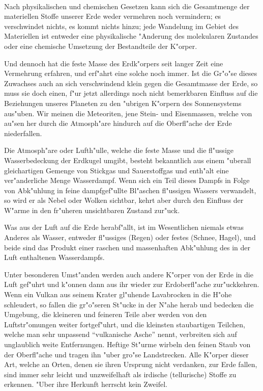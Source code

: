 \documentclass[a4paper, 11pt, oneside]{article}
\begin{document}
\paragraph{}
Nach physikalischen und chemischen Gesetzen kann sich die Gesamtmenge der materiellen Stoffe unserer Erde weder vermehren noch vermindern; es verschwindet nichts, es kommt nichts hinzu; jede Wandelung im Gebiet des Materiellen ist entweder eine physikalische "Anderung des molekularen Zustandes oder eine chemische Umsetzung der Bestandteile der K"orper.

Und dennoch hat die feste Masse des Erdk"orpers seit langer Zeit eine Vermehrung erfahren, und erf"ahrt eine solche noch immer. Ist die Gr"o"se dieses Zuwachses auch an sich verschwindend klein gegen die Gesamtmasse der Erde, so muss sie doch einen, f"ur jetzt allerdings noch nicht bemerkbaren Einfluss auf die Beziehungen unseres Planeten zu den "ubrigen K"orpern des Sonnensystems aus"uben. Wir meinen die Meteoriten, jene Stein- und Eisenmassen, welche von au"sen her durch die Atmosph"are hindurch auf die Oberfl"ache der Erde niederfallen.

Die Atmosph"are oder Lufth"ulle, welche die feste Masse und die fl"ussige Wasserbedeckung der Erdkugel umgibt, besteht bekanntlich aus einem "uberall gleichartigen Gemenge von Stickgas und Sauerstoffgas und enth"alt eine ver"anderliche Menge Wasserdampf. Wenn sich ein Teil dieses Dampfs in Folge von Abk"uhlung in feine dampfgef"ullte Bl"aschen fl"ussigen Wassers verwandelt, so wird er als Nebel oder Wolken sichtbar, kehrt aber durch den Einfluss der W"arme in den fr"uheren unsichtbaren Zustand zur"uck.

Was aus der Luft auf die Erde herabf"allt, ist im Wesentlichen niemals etwas Anderes als Wasser, entweder fl"ussiges (Regen) oder festes (Schnee, Hagel), und beide sind das Produkt einer raschen und massenhaften Abk"uhlung des in der Luft enthaltenen Wasserdampfs.

Unter besonderen Umst"anden werden auch andere K"orper von der Erde in die Luft gef"uhrt und k"onnen dann aus ihr wieder zur Erdoberfl"ache zur"uckkehren. Wenn ein Vulkan aus seinem Krater gl"uhende Lavabrocken in die H"ohe schleudert, so fallen die gr"o"seren St"ucke in der N"ahe herab und bedecken die Umgebung, die kleineren und feineren Teile aber werden von den Luftstr"omungen weiter fortgef"uhrt, und die kleinsten staubartigen Teilchen, welche man sehr unpassend "`vulkanische Asche"' nennt, verbreiten sich auf unglaublich weite Entfernungen. Heftige St"urme wirbeln den feinen Staub von der Oberfl"ache und tragen ihn "uber gro"se Landstrecken. Alle K"orper dieser Art, welche an Orten, denen sie ihren Ursprung nicht verdanken, zur Erde fallen, sind immer sehr leicht und unzweifelhaft als irdische (tellurische) Stoffe zu erkennen. "Uber ihre Herkunft herrscht kein Zweifel.
\end{document}
